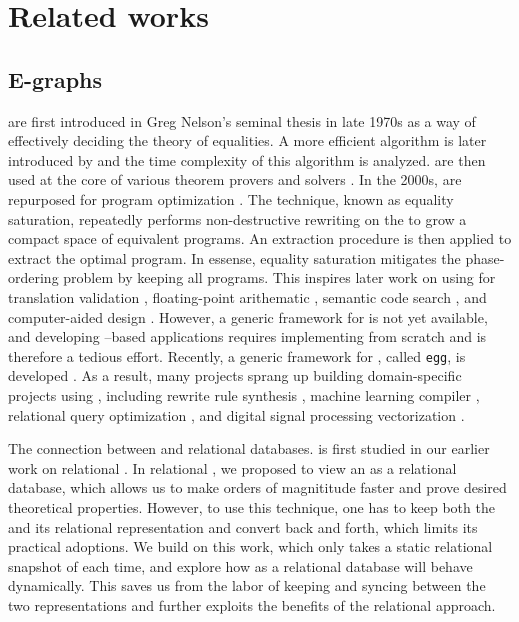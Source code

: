 \chapter{Related works}\label{chapter/related-works}

\section{E-graphs}

\Egraphs are first introduced in Greg Nelson's seminal thesis \citep{nelson-thesis}
 in late 1970s 
 as a way of effectively deciding the theory of equalities.
A more efficient algorithm is later introduced by \citet{tarjan-congruence} 
 and the time complexity of this algorithm is analyzed.
\Egraphs are then used at the core of 
 various theorem provers and solvers \citep{simplify, z3, cvc4}.
In the 2000s, 
 \egraphs are repurposed for program optimization \citet{eqsat,denali}.
The technique, known as equality saturation, 
 repeatedly performs non-destructive rewriting on the \egraphs 
 to grow a compact space of equivalent programs.
An extraction procedure is then applied to extract the optimal program.
In essense, equality saturation mitigates the phase-ordering problem by keeping 
 all programs.
This inspires later work on using \egraphs for
 translation validation \citep{eqsat-tv}, 
 floating-point arithematic \citep{herbie},
 semantic code search \citep{semsearch},
 and computer-aided design \citep{carpentry-compiler}.
However, a generic framework for \egraphs is not yet available,
 and developing \egraphs--based applications
 requires implementing \egraphs from scratch and is therefore a tedious effort.
Recently, a generic framework for \egraphs, 
 called \texttt{egg}, is developed \citep{egg}.
As a result, many projects sprang up building domain-specific projects using \egraphs,
 including rewrite rule synthesis \citep{ruler}, machine learning compiler \citep{tensat,glenside},
 relational query optimization \citep{spores}, and
 digital signal processing vectorization \citep{diospyros}.

The connection between \egraphs and relational databases.
 is first studied in our earlier work on relational \ematching\citep{relational-ematching}.
In relational \ematching, 
 we proposed to view an \egraph as a relational database,
 which allows us to make \ematching orders of magnititude faster
 and prove desired theoretical properties.
However, to use this technique,
 one has to keep both the \egraph and its relational representation 
 and convert back and forth, which limits its practical adoptions.
We build on this work, 
 which only takes a static relational snapshot of \egraph each time,
 and explore how \egraphs as a relational database will behave dynamically.
This saves us from the labor of keeping and syncing between the two \egraph representations
 and further exploits the benefits of the relational \ematching approach.


